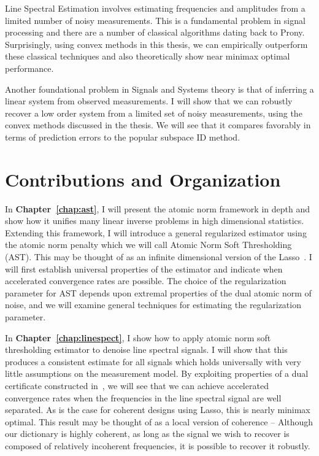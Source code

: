 Line Spectral Estimation involves estimating frequencies and amplitudes from a
limited number of noisy measurements. This is a fundamental problem in signal
processing and there are a number of classical algorithms dating back to Prony.
Surprisingly, using convex methods in this thesis, we can empirically outperform
these classical techniques and also theoretically show near minimax optimal
performance.

Another foundational problem in Signals and Systems theory is that of inferring
a linear system from observed measurements. I will show that we can robustly
recover a low order system from a limited set of noisy measurements, using the
convex methods discussed in the thesis. We will see that it compares favorably
in terms of prediction errors to the popular subspace ID method.

\section*{Contributions and Organization} %
\label{sec:contributions}

In \textbf{Chapter~\ref{chap:ast}}, I will present the atomic norm framework in
depth and show how it unifies many linear inverse problems in high dimensional
statistics. Extending this framework, I will introduce a general regularized
estimator using the atomic norm penalty which we will call Atomic Norm Soft
Thresholding (AST). This may be thought of as an infinite dimensional version of
the Lasso~\cite{tibshirani96}. I will first establish universal properties of
the estimator and indicate when accelerated convergence rates are possible. The
choice of the regularization parameter for AST depends upon extremal properties
of the dual atomic norm of noise, and we will examine general techniques for
estimating the regularization parameter.

In \textbf{Chapter~\ref{chap:linespect}}, I show how to apply atomic norm soft
thresholding estimator to denoise line spectral signals. I will show that this
produces a consistent estimate for all signals which holds universally with very
little assumptions on the measurement model. By exploiting properties of a dual
certificate constructed in~\cite{cg_exact12,cg_noisy}, we will see that we can
achieve accelerated convergence rates when the frequencies in the line spectral
signal are well separated. As is the case for coherent designs using Lasso, this
is nearly minimax optimal. This result may be thought of as a local version of
coherence -- Although our dictionary is highly coherent, as long as the signal
we wish to recover is composed of relatively incoherent frequencies, it is
possible to recover it robustly.

